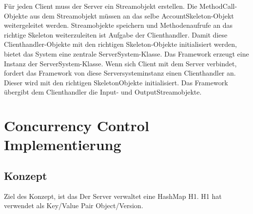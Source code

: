 Für jeden Client muss der Server ein Streamobjekt erstellen. Die
Method\-Call-Objekte aus dem Streamobjekt müssen an das selbe
AccountSkeleton-Objekt weitergeleitet werden. Streamobjekte speichern
und Methodenauf\-rufe an das richtige Skeleton weiterzuleiten ist
Aufgabe der Clienthandler. Damit diese Clienthandler-Objekte mit den
richtigen Skeleton-Objekte initialisiert werden, bietet das System
eine zentrale ServerSystem-Klasse. Das Framework erzeugt eine Instanz
der ServerSystem-Klasse. Wenn sich Client mit dem Server verbindet,
fordert das Framework von diese Serversystem\-instanz einen
Clienthandler an. Dieser wird mit den richtigen SkeletonObjekte
initialisiert. Das Framework übergibt dem Clienthandler die Input- und OutputStreamobjekte.

\section{Concurrency Control Implementierung }
\label{sec:conc-contr-impl}

\subsection{Konzept}
\label{sec:konzept}

Ziel des Konzept, ist das  
Der Server verwaltet eine HashMap H1. H1 hat verwendet als Key/Value Pair Object/Version. 



